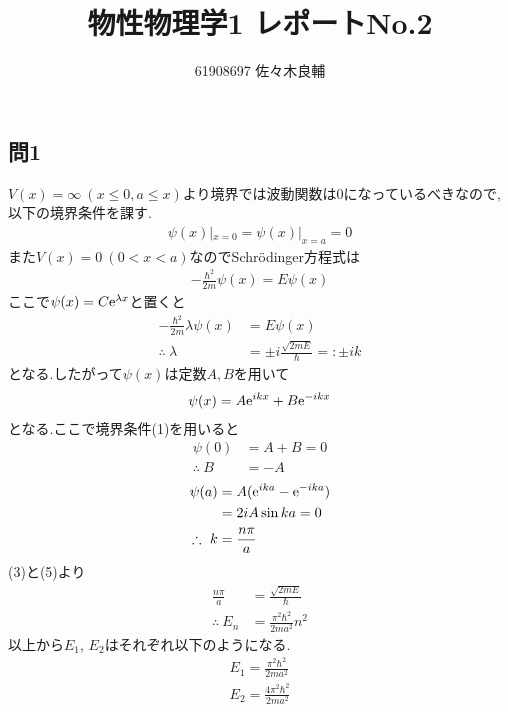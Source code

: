 \documentclass[uplatex,a4j,11pt,dvipdfmx]{jsarticle}
\begin{document}
\title{物性物理学1 レポートNo.2}
\author{61908697 佐々木良輔}
\date{}
\maketitle
\subsection*{問1}
$V(x)=\infty\ (x\leq 0,a\leq x)$より境界では波動関数は0になっているべきなので,以下の境界条件を課す.
\begin{align}
  \psi(x)|_{x=0}=\psi(x)|_{x=a}=0
\end{align}
また$V(x)=0\ (0<x<a)$なのでSchr\"{o}dinger方程式は
\begin{align}
  -\frac{\hbar^2}{2m}\psi(x)=E\psi(x)
\end{align}
ここで$\psi(x)=C{\rm e}^{\lambda x}$と置くと
\begin{align}
  -\frac{\hbar^2}{2m}\lambda\psi(x)&=E\psi(x)\nonumber\\
  \therefore\ \lambda&=\pm i\frac{\sqrt{2mE}}{\hbar}=:\pm ik
\end{align}
となる.したがって$\psi(x)$は定数$A,B$を用いて
\begin{align}
  \psi(x)=A{\rm e}^{ikx}+B{\rm e}^{-ikx}
\end{align}
となる.ここで境界条件(1)を用いると
\begin{align}
  \psi(0)&=A+B=0\nonumber\\
  \therefore\ B&=-A
\end{align}
\begin{align}
  \psi(a)&=A({\rm e}^{ika}-{\rm e}^{-ika})\nonumber\\
  &=2iA\sin ka=0\nonumber\\
  \therefore\ k&=\frac{n\pi}{a}
\end{align}
(3)と(5)より
\begin{align}
  \frac{n\pi}{a}&=\frac{\sqrt{2mE}}{\hbar}\nonumber\\
  \therefore\ E_n&=\frac{\pi^2\hbar^2}{2ma^2}n^2
\end{align}
以上から$E_1$, $E_2$はそれぞれ以下のようになる.
\begin{align}
  E_1=\frac{\pi^2\hbar^2}{2ma^2}\\
  E_2=\frac{4\pi^2\hbar^2}{2ma^2}
\end{align}
\end{document}
